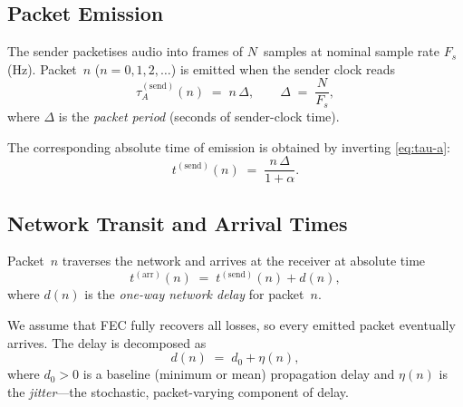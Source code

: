 \documentclass[11pt, a4paper]{article}
\theoremstyle{definition}
\theoremstyle{plain}
\theoremstyle{remark}
\begin{document}
\subsection{Packet Emission}\label{sec:emission}

The sender packetises audio into frames of $N$~samples at nominal sample
rate $F_s$ (Hz).  Packet~$n$ ($n = 0, 1, 2, \dots$) is emitted when the
sender clock reads
\begin{equation}\label{eq:send-clock}
  \tau_A^{(\text{send})}(n) \;=\; n\,\Delta, \qquad
  \Delta \;=\; \frac{N}{F_s},
\end{equation}
where $\Delta$ is the \emph{packet period} (seconds of sender-clock time).

The corresponding absolute time of emission is obtained by inverting
\eqref{eq:tau-a}:
\begin{equation}\label{eq:send-abs}
  t^{(\text{send})}(n)
    \;=\; \frac{n\,\Delta}{1 + \alpha}.
\end{equation}

\subsection{Network Transit and Arrival Times}\label{sec:arrival}

Packet~$n$ traverses the network and arrives at the receiver at absolute
time
\begin{equation}\label{eq:arrive-abs}
  t^{(\text{arr})}(n) \;=\; t^{(\text{send})}(n) + d(n),
\end{equation}
where $d(n)$ is the \emph{one-way network delay} for packet~$n$.

We assume that FEC fully recovers all losses, so every emitted packet
eventually arrives.  The delay is decomposed as
\begin{equation}\label{eq:delay-decomp}
  d(n) \;=\; d_0 + \eta(n),
\end{equation}
where $d_0 > 0$ is a baseline (minimum or mean) propagation delay
and $\eta(n)$ is the \emph{jitter}---the stochastic, packet-varying
component of delay.
\end{document}
